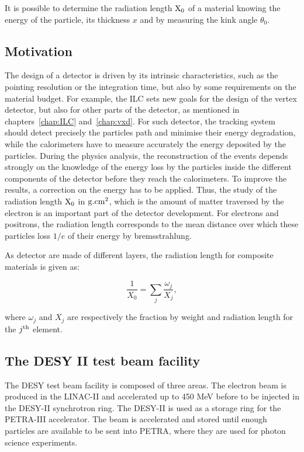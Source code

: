     It is possible to determine the radiation length $\rm{X_0}$ of a material knowing the energy of the particle, its thickness $x$ and by measuring the kink angle $\theta_0$.

    \subsection{Motivation}

    The design of a detector is driven by its intrinsic characteristics, such as the pointing resolution or the integration time, but also by some requirements on the material budget.
    For example, the \gls{ILC} sets new goals for the design of the vertex detector, but also for other parts of the detector, as mentioned in chapters~\ref{chap:ILC} and~\ref{chap:vxd}.
    For such detector, the tracking system should detect precisely the particles path and minimise their energy degradation, while the calorimeters have to measure accurately the energy deposited by the particles.
    During the physics analysis, the reconstruction of the events depends strongly on the knowledge of the energy loss by the particles inside the different components of the detector before they reach the calorimeters. 
    To improve the results, a correction on the energy has to be applied.
    Thus, the study of the radiation length $\rm{X_{0}}$ in $\rm{g.cm}^{2}$, which is the amount of matter traversed by the electron is an important part of the detector development.
    For electrons and positrons, the radiation length corresponds to the mean distance over which these particles loss $1/e$ of their energy by bremsstrahlung.

    As detector are made of different layers, the radiation length for composite materials is given as:

    \begin{equation}
      \frac{1}{X_{0}} = \sum_{j} \frac{\omega_{j}}{X_{j}},
    \end{equation}

   where $\omega_{j}$ and $X_{j}$ are respectively the fraction by weight and radiation length for the $j^{\rm{th}}$ element.

    \subsection{The DESY II test beam facility}

    The \gls{DESY} test beam facility \cite{DESYII} is composed of three areas.
    The electron beam is produced in the LINAC-II and accelerated up to 450 MeV before to be injected in the DESY-II synchrotron ring.
    The DESY-II is used as a storage ring for the PETRA-III accelerator. 
    The beam is accelerated and stored until enough particles are available to be sent into PETRA, where they are used for photon science experiments.
    

